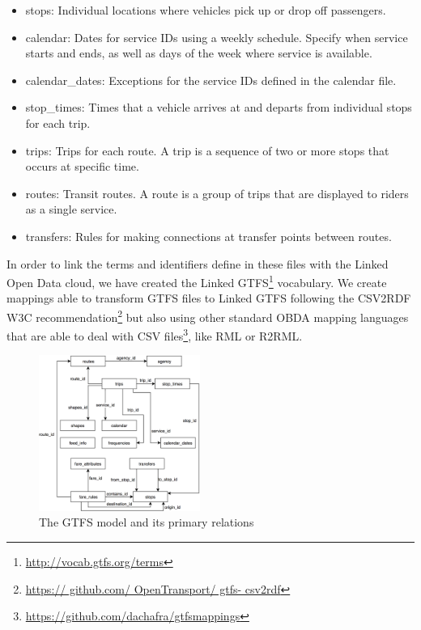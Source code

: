 \documentclass[sw]{iosart2x}
\begin{document}
\begin{itemize}
	\item stops: Individual locations where vehicles pick up or drop off passengers.
	\item calendar: Dates for service IDs using a weekly schedule. Specify when service starts and ends, as well as days of the week where service is available.
	\item calendar\_dates: Exceptions for the service IDs defined in the calendar file.
	\item stop\_times: Times that a vehicle arrives at and departs from individual stops for each trip.
	\item trips: Trips for each route. A trip is a sequence of two or more stops that occurs at specific time.
	\item routes: Transit routes. A route is a group of trips that are displayed to riders as a single service.
	\item transfers: Rules for making connections at transfer points between routes.
\end{itemize}

In order to link the terms and identifiers define in these files with the Linked Open Data cloud, we have created the Linked GTFS\footnote{\url{http://vocab.gtfs.org/terms}} vocabulary. We create mappings able to transform GTFS files to Linked GTFS following the CSV2RDF\cite{tennison2015model} W3C recommendation\footnote{\url{https:// github.com/ OpenTransport/ gtfs- csv2rdf}} but also using other standard OBDA mapping languages that are able to deal with CSV files\footnote{\url{https://github.com/dachafra/gtfsmappings}}, like RML\cite{dimou2014rml} or R2RML\cite{das2012r2rml}. 

\begin{figure}[t]
	\includegraphics[width=0.47\textwidth]{images/gtfsmodel.png}
	\caption{The GTFS model and its primary relations}\label{fig:gtfs}
\end{figure}
\end{document}
